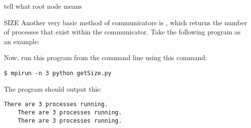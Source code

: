 tell what root node means

SIZE
    Another very basic method of communicators is , which returns the number of processes that exist within the communicator.
    Take the following program as an example:
    
    Now, run this program from the command line using this command:
    \begin{lstlisting}[style=ShellInput]
    $ mpirun -n 3 python getSize.py
    \end{lstlisting}
    The program should output this:
    \begin{lstlisting}[style=ShellOutput]
    There are 3 processes running.
    There are 3 processes running.
    There are 3 processes running.
    \end{lstlisting}
